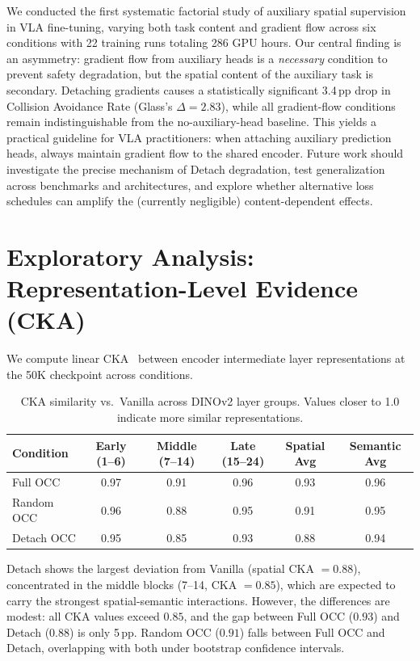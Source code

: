 \documentclass[letterpaper]{article}
\newcommand{\pp}{\,\textrm{pp}}
\begin{document}
We conducted the first systematic factorial study of auxiliary spatial supervision in VLA fine-tuning, varying both task content and gradient flow across six conditions with 22 training runs totaling 286 GPU hours.
Our central finding is an asymmetry: gradient flow from auxiliary heads is a \emph{necessary} condition to prevent safety degradation, but the spatial content of the auxiliary task is secondary.
Detaching gradients causes a statistically significant 3.4\pp{} drop in Collision Avoidance Rate (Glass's $\Delta=2.83$), while all gradient-flow conditions remain indistinguishable from the no-auxiliary-head baseline.
This yields a practical guideline for VLA practitioners: when attaching auxiliary prediction heads, always maintain gradient flow to the shared encoder.
Future work should investigate the precise mechanism of Detach degradation, test generalization across benchmarks and architectures, and explore whether alternative loss schedules can amplify the (currently negligible) content-dependent effects.


\appendix
\section{Exploratory Analysis: Representation-Level Evidence (CKA)}
\label{app:cka}

We compute linear CKA~\citep{kornblith2019similarity} between encoder intermediate layer representations at the 50K checkpoint across conditions.

\begin{table}[h]
\centering
\caption{CKA similarity vs.\ Vanilla across DINOv2 layer groups. Values closer to 1.0 indicate more similar representations.}
\label{tab:cka}
\small
\begin{tabular}{lccccc}
\toprule
\textbf{Condition} & \textbf{Early (1--6)} & \textbf{Middle (7--14)} & \textbf{Late (15--24)} & \textbf{Spatial Avg} & \textbf{Semantic Avg} \\
\midrule
Full OCC   & 0.97 & 0.91 & 0.96 & 0.93 & 0.96 \\
Random OCC & 0.96 & 0.88 & 0.95 & 0.91 & 0.95 \\
Detach OCC & 0.95 & 0.85 & 0.93 & 0.88 & 0.94 \\
\bottomrule
\end{tabular}
\end{table}

Detach shows the largest deviation from Vanilla (spatial CKA $=0.88$), concentrated in the middle blocks (7--14, CKA $=0.85$), which are expected to carry the strongest spatial-semantic interactions.
However, the differences are modest: all CKA values exceed $0.85$, and the gap between Full OCC ($0.93$) and Detach ($0.88$) is only 5\pp.
Random OCC ($0.91$) falls between Full OCC and Detach, overlapping with both under bootstrap confidence intervals.
\end{document}
